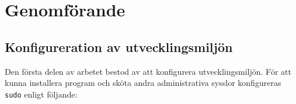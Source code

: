 %
%
%


\section{Genomförande}


\subsection{Konfigureration av utvecklingsmiljön}
% 
%   
%

Den första delen av arbetet bestod av att konfigurera utvecklingsmiljön.
För att kunna installera program och sköta andra administrativa sysslor
konfigureras \texttt{sudo} enligt följande:

